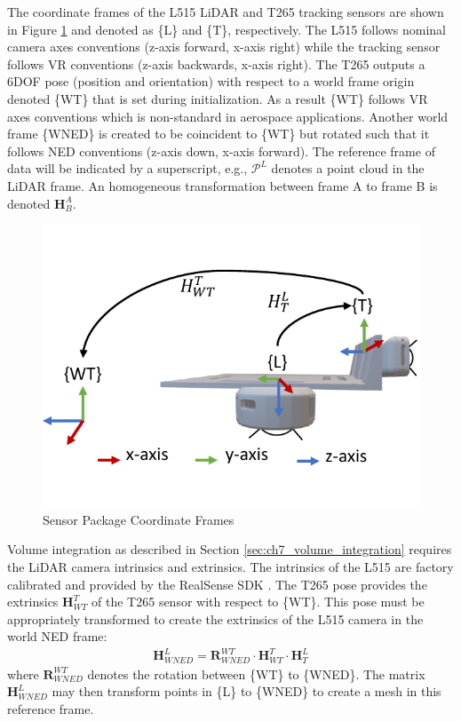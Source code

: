 The coordinate frames of the L515 LiDAR and T265 tracking sensors are shown in Figure \ref{fig:ch7_sensor_frames} and denoted as \{L\} and \{T\}, respectively. The L515 follows nominal camera axes conventions (z-axis forward, x-axis right) while the tracking sensor follows \acf{VR} conventions (z-axis backwards, x-axis right). The T265 outputs a 6DOF pose (position and orientation) with respect to a world frame origin denoted \{WT\} that is set during initialization. As a result \{WT\} follows \ac{VR} axes conventions which is non-standard in aerospace applications. Another world frame \{WNED\} is created to be coincident to \{WT\} but rotated such that it follows NED conventions (z-axis down, x-axis forward). The reference frame of data will be indicated by a superscript, e.g., $\mathcal{P}^{L}$ denotes a point cloud in the LiDAR frame. An homogeneous transformation between frame A to frame B is denoted $\mathbf{H}^A_B$.

\begin{figure}[!htb]
  \centering
  \includegraphics[page=1,clip,trim=0cm 1cm 0cm 1cm,width=.45\linewidth]{chapter_7_experiments/imgs/sensor_frames.pdf}
  \caption[Sensor package coordinate frames]{Sensor Package Coordinate Frames}\label{fig:ch7_sensor_frames}
\end{figure}
Volume integration as described in Section \ref{sec:ch7_volume_integration} requires the LiDAR camera intrinsics and extrinsics. The intrinsics of the L515 are factory calibrated and provided by the RealSense SDK \cite{noauthor_github_2020-4}. The T265 pose provides the extrinsics $\mathbf{H}^{T}_{WT}$  of the T265 sensor with respect to \{WT\}. This pose must be appropriately transformed to create the extrinsics of the L515 camera in the world NED frame:
\begin{align*}
   \mathbf{H}^{L}_{WNED}  =  \mathbf{R}^{WT}_{WNED} \cdot \mathbf{H}^{T}_{WT} \cdot \mathbf{H}^{L}_{T}
\end{align*}
where $\mathbf{R}^{WT}_{WNED}$ denotes the rotation between \{WT\} to \{WNED\}. The matrix $\mathbf{H}^{L}_{WNED}$ may then transform points in \{L\} to \{WNED\} to create a mesh in this reference frame.

